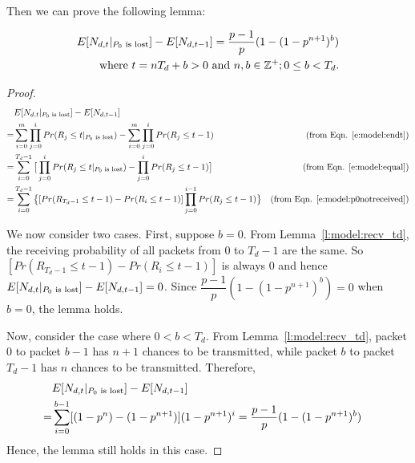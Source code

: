     Then we can prove the following lemma:
    \begin{lemma}
    \label{l:model:p0lost}
    \begin{eqnarray*}
    E[N_{d,t}|_{\textrm{$P_0$ is lost}}] - E[N_{d,t-1}] = \dfrac{p-1}{p}(1-(1-p^{n+1})^b) \\
    \textrm{where $t = nT_{d}+b > 0$ and $n,b \in\mathbb{Z^+}; 0 \le b<T_d$.}
    \end{eqnarray*}
    \end{lemma}
    \begin{proof}
    \begin{align*}
     &E[N_{d,t}|_{\textrm{$P_0$ is lost}}] - E[N_{d,t-1}] & \\
    =& \sum_{i=0}^{m}\prod_{j=0}^{i}Pr(R_{j} \le t|_{\textrm{$P_0$ is lost}}) - \sum_{i=0}^{m}\prod_{j=0}^{i}Pr(R_{j} \le t-1) & 
        \text{(from Eqn. \ref{e:model:endt})} \\
    =& \sum_{i=0}^{T_d - 1}\big[\prod_{j=0}^{i}Pr(R_{j} \le t|_{\textrm{$P_0$ is lost}}) - \prod_{j=0}^{i}Pr(R_{j} \le t-1)\big] &
        \text{(from Eqn. \ref{e:model:equal})}\\
    =& \sum_{i=0}^{T_d - 1}\big\{[Pr(R_{T_d-1} \le t-1) - Pr(R_{i} \le t-1)]\prod_{j=0}^{i-1}Pr(R_{j} \le t-1)\big\} 
        & \text{(from Eqn. \ref{e:model:p0notreceived})}\\
    \end{align*}

    We now consider two cases.  First, suppose $b = 0$.  From Lemma~\ref{l:model:recv_td}, the receiving probability of 
    all packets from 0 to $T_d - 1$ are the same. So $[Pr(R_{T_d-1} \leq t-1)
    - Pr(R_i \leq t-1)]$ is always 0 and hence $E[N_{d,t}|_{\textrm{$P_0$ is lost}}] - E[N_{d,t-1}] = 0$. 
    Since $\dfrac{p-1}{p}(1- (1-p^{n+1})^b) = 0$ when $b = 0$, the lemma holds.

    Now, consider the case where $0 < b < T_d$.
    From Lemma~\ref{l:model:recv_td}, packet $0$ to packet $b-1$ has $n+1$ chances to
    be transmitted, while packet $b$ to packet $T_d - 1$ has $n$ chances to
    be transmitted. Therefore, 
    \begin{align*}
     &E[N_{d,t}|_{\textrm{$P_0$ is lost}}] - E[N_{d,t-1}] & \\
    =&\sum_{i=0}^{b-1}[(1-p^{n})-(1-p^{n+1})](1-p^{n+1})^{i} = \dfrac{p-1}{p}(1- (1-p^{n+1})^b) \\
    \end{align*}
    Hence, the lemma still holds in this case.
    \end{proof}
    
